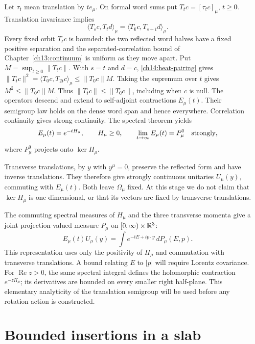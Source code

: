Let $\tau_t$ mean translation by $te_\mu$. On formal word sums put
$T_tc=[\tau_tc]_\mu$, $t\ge0$. Translation invariance implies
\begin{equation}\label{ch14:heat-pairing}
 \langle T_sc,T_td\rangle_\mu
             =\langle T_0c,T_{s+t}d\rangle_\mu.
\end{equation}
Every fixed orbit $T_tc$ is bounded: the two reflected word halves
have a fixed positive separation and the separated-correlation
bound of Chapter~\ref{ch13:continuum} is uniform as they move apart.
Put $M=\sup_{t\ge0}\|T_tc\|$. With $s=t$ and $d=c$,
\eqref{ch14:heat-pairing} gives
$\|T_tc\|^2=\langle T_0c,T_{2t}c\rangle_\mu\le\|T_0c\|M$.
Taking the supremum over $t$ gives $M^2\le\|T_0c\|M$.
Thus $\|T_tc\|\le\|T_0c\|$, including when $c$ is null.
The operators descend and extend to self-adjoint contractions
$E_\mu(t)$. Their semigroup law holds on the dense word span and
hence everywhere. Correlation continuity gives strong continuity.
The spectral theorem yields
\begin{equation}\label{ch14:heat}
 E_\mu(t)=e^{-tH_\mu},\qquad H_\mu\ge0,
 \qquad \lim_{t\to\infty}E_\mu(t)=P_\mu^0
 \quad\hbox{strongly},
\end{equation}
where $P_\mu^0$ projects onto $\ker H_\mu$.

Transverse translations, by $y$ with $y^\mu=0$, preserve the
reflected form and have inverse translations. They therefore give
strongly continuous unitaries $U_\mu(y)$, commuting with $E_\mu(t)$.
Both leave $\Omega_\mu$ fixed. At this stage we do not claim that
$\ker H_\mu$ is one-dimensional, or that its vectors are fixed by
transverse translations.

The commuting spectral measures of $H_\mu$ and the three transverse
momenta give a joint projection-valued measure $P_\mu$ on
$[0,\infty)\times\mathbb R^3$:
\begin{equation}\label{ch14:coordinate-spectrum}
 E_\mu(t)U_\mu(y)
     =\int e^{-tE+ip\cdot y}\,dP_\mu(E,p).
\end{equation}
This representation uses only the positivity of $H_\mu$ and commutation with
transverse translations. A bound relating $E$ to $|p|$ will require
Lorentz covariance.
For $\operatorname{Re}z>0$, the same spectral integral defines the
holomorphic contraction $e^{-zH_\mu}$; its derivatives are bounded
on every smaller right half-plane. This elementary analyticity of the translation semigroup
will be used before any rotation action is constructed.

\section{Bounded insertions in a slab}
\label{ch14:slabs}

